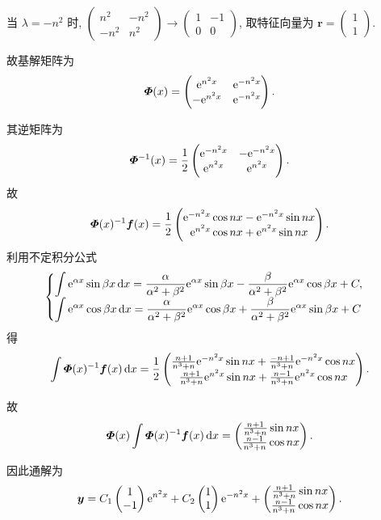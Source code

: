 \begin{solution}
  当 $\lambda=-n^2$ 时, $\begin{pmatrix}n^2&-n^2\\-n^2&n^2\end{pmatrix}\to\begin{pmatrix}1&-1\\0&0\end{pmatrix}$,
  取特征向量为 $\bm{r}=\begin{pmatrix}1\\1\end{pmatrix}$.

  故基解矩阵为
  \[\bm{\varPhi}(x)=\begin{pmatrix}\mathrm{e}^{n^2x}&\mathrm{e}^{-n^2x}\\-\mathrm{e}^{n^2x}&\mathrm{e}^{-n^2x}\end{pmatrix}.\]

  其逆矩阵为
  \[\bm{\varPhi}^{-1}(x)
    = \frac{1}{2}\begin{pmatrix}\mathrm{e}^{-n^2x}&-\mathrm{e}^{-n^2x}\\\mathrm{e}^{n^2x}&\mathrm{e}^{n^2x}\end{pmatrix}.\]
  故
  \[\bm{\varPhi}(x)^{-1}\bm{f}(x)
    = \frac{1}{2}\begin{pmatrix}\mathrm{e}^{-n^2x}\cos nx-\mathrm{e}^{-n^2x}\sin nx\\\mathrm{e}^{n^2x}\cos nx+\mathrm{e}^{n^2x}\sin nx\end{pmatrix}.\]
  利用不定积分公式
  \[\begin{cases}\displaystyle
  \int\mathrm{e}^{\alpha x}\sin\beta x\mathop{}\!\mathrm{d} x=\frac{\alpha}{\alpha^2+\beta^2}\mathrm{e}^{\alpha x}\sin\beta x-\frac{\beta}{\alpha^2+\beta^2}\mathrm{e}^{\alpha x}\cos\beta x+C, \\
  \displaystyle\int\mathrm{e}^{\alpha x}\cos\beta x\mathop{}\!\mathrm{d} x=\frac{\alpha}{\alpha^2+\beta^2}\mathrm{e}^{\alpha x}\cos\beta x+\frac{\beta}{\alpha^2+\beta^2}\mathrm{e}^{\alpha x}\sin\beta x+C
  \end{cases}\]
  得
  \[\int\bm{\varPhi}(x)^{-1}\bm{f}(x)\mathop{}\!\mathrm{d} x=\frac{1}{2}\begin{pmatrix}\frac{n+1}{n^3+n}\mathrm{e}^{-n^2x}\sin nx+\frac{-n+1}{n^3+n}\mathrm{e}^{-n^2x}\cos nx\\
  \frac{n+1}{n^3+n}\mathrm{e}^{n^2x}\sin nx+\frac{n-1}{n^3+n}\mathrm{e}^{n^2x}\cos nx
  \end{pmatrix}.\]

  故
  \[\bm{\varPhi}(x)\int\bm{\varPhi}(x)^{-1}\bm{f}(x)\mathop{}\!\mathrm{d} x
    =\begin{pmatrix}
      \frac{n+1}{n^3+n}\sin nx \\
      \frac{n-1}{n^3+n}\cos nx
     \end{pmatrix}.\]

  因此通解为
  \[\bm{y} = C_1\begin{pmatrix}1\\-1\end{pmatrix}\mathrm{e}^{n^2x}
    + C_2\begin{pmatrix}1\\1\end{pmatrix}\mathrm{e}^{-n^2x}
    + \begin{pmatrix}
        \frac{n+1}{n^3+n}\sin nx\\
        \frac{n-1}{n^3+n}\cos nx
      \end{pmatrix}.\]


\end{solution}
